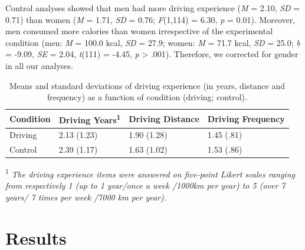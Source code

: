\documentclass[authordate, empirical]{jote-new-article}
\begin{document}
Control analyses showed that men had more driving experience (\emph{M} = 2.10, \emph{SD} = 0.71) than women (\emph{M} = 1.71, \emph{SD} = 0.76; \emph{F}(1,114) = 6.30, \emph{p }= 0.01). Moreover, men consumed more calories than women irrespective of the experimental condition (men: \emph{M} = 100.0 kcal, \emph{SD} = 27.9; women: \emph{M} = 71.7 kcal, \emph{SD} = 25.0; \emph{b }= -9.09, \emph{SE }= 2.04, \emph{t}(111) = -4.45, \emph{p} > .001). Therefore, we corrected for gender in all our analyses.





\begin{table}[t]
  \begin{fullwidth}
    \caption{ Means and standard deviations of driving experience (in years, distance and frequency) as a function of condition (driving; control).}
    \label{tab:tab1}
    \begin{tabularx}{\linewidth}{@{} X X X X @{}}
      \toprule

      \textbf{Condition} & \textbf{Driving Years}\textsuperscript{\textbf{1}}
                         & \textbf{Driving }\newline\textbf{Distance}         & \textbf{Driving }\newline \textbf{Frequency}              \\
      \midrule

      Driving            & 2.13 (1.23)                                        & 1.90 (1.28)                                  & 1.45 (.81) \\

      Control            & 2.39 (1.17)                                        & 1.63 (1.02)                                  & 1.53 (.86) \\
      \bottomrule
    \end{tabularx}

    \textsuperscript{1} \emph{\small The driving experience items were answered on five-point Likert scales ranging from respectively 1 (up to 1 year/once a week /1000km per year) to 5 (over 7 years/ 7 times per week /7000 km per year).}

  \end{fullwidth}
\end{table}



\section{Results}
\end{document}
